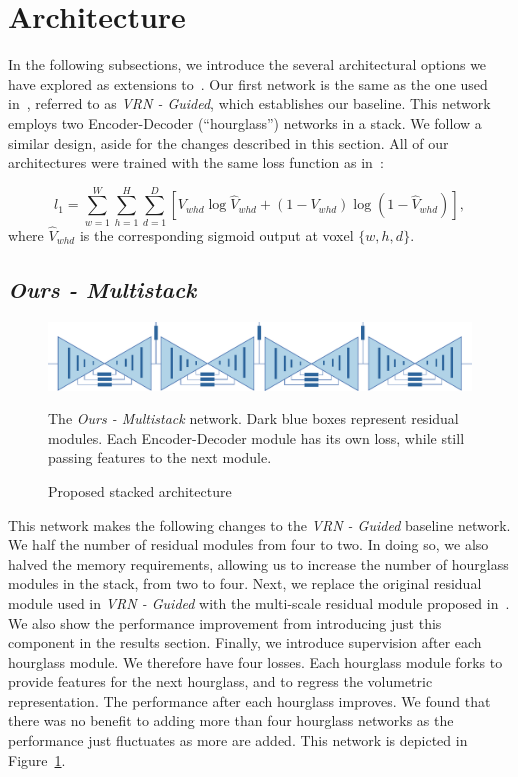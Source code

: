 \section{Architecture}

In the following subsections, we introduce the several architectural
options we have explored as extensions to~\cite{jackson2017vrn}. Our
first network is the same as the one used in~\cite{jackson2017vrn}, referred
to as \textit{VRN - Guided}, which establishes our baseline. This
network employs two Encoder-Decoder (``hourglass'') networks in a
stack. We follow a similar design, aside for the changes described in
this section. All of our architectures were trained with the same loss
function as in~\cite{jackson2017vrn}:

\begin{equation}
  l_{1} = \sum\limits_{w=1}^{W} \sum\limits_{h=1}^{H}\sum\limits_{d=1}^{D}[V_{whd}\log \widehat{V}_{whd}+(1-V_{whd})\log(1-\widehat{V}
_{whd})],
\end{equation}
where $\widehat{V}_{whd}$ is the corresponding sigmoid output at voxel
$\{w,h,d\}$.

\subsection{\textit{Ours - Multistack}}

\begin{figure}
  \includegraphics[width=\linewidth]{img/multistack.pdf}
  \caption{Proposed stacked architecture}{The \textit{Ours -
      Multistack} network. Dark blue boxes represent residual
    modules. Each Encoder-Decoder module has its own loss, while still
    passing features to the next module.}
  \label{fig:multistack}
\end{figure}


This network makes the following changes to the \textit{VRN - Guided}
baseline network. We half the number of residual modules from four to
two. In doing so, we also halved the memory requirements, allowing us
to increase the number of hourglass modules in the stack, from two to
four. Next, we replace the original residual module used in
\textit{VRN - Guided} with the multi-scale residual module proposed
in~\cite{bulat2017binarized}. We also show the performance improvement
from introducing just this component in the results section. Finally,
we introduce supervision after each hourglass module. We therefore
have four losses. Each hourglass module forks to provide features for
the next hourglass, and to regress the volumetric representation. The
performance after each hourglass improves. We found that there was no
benefit to adding more than four hourglass networks as the performance
just fluctuates as more are added. This network is depicted in
Figure~\ref{fig:multistack}.

